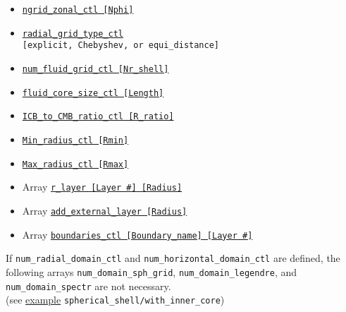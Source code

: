 \begin{itemize}
\begin{itemize}
			\item \hyperref[href_t:ngrid_zonal_ctl]{\tt ngrid\_zonal\_ctl [Nphi]}
%
			\item \hyperref[href_t:radial_grid_type_ctl]{\tt radial\_grid\_type\_ctl} \\
				\verb|[explicit, Chebyshev, or equi_distance]| \label{href_i:radial_grid_type_ctl}
%
			\item \hyperref[href_t:num_fluid_grid_ctl]{\tt num\_fluid\_grid\_ctl  [Nr\_shell]}
			\item \hyperref[href_t:fluid_core_size_ctl]{\tt fluid\_core\_size\_ctl  [Length]}
			\item \hyperref[href_t:ICB_to_CMB_ratio_ctl]{\tt ICB\_to\_CMB\_ratio\_ctl  [R\_ratio]}
			\item \hyperref[href_t:Min_radius_ctl]{\tt Min\_radius\_ctl  [Rmin]}    
				\label{href_i:Min_radius_ctl}
			\item \hyperref[href_t:Max_radius_ctl]{\tt Max\_radius\_ctl  [Rmax]}    
				\label{href_i:Max_radius_ctl}
%
\\
			\item Array \hyperref[href_t:r_layer]{\tt r\_layer  [Layer \#]  [Radius]}    
            \item Array \hyperref[href_t:add_external_layer]{\tt add\_external\_layer  [Radius]}
%
			\item Array \hyperref[href_t:boundaries_ctl]{\tt boundaries\_ctl  [Boundary\_name]  [Layer \#]}    
			\end{itemize}
		\end{itemize}

If \verb|num_radial_domain_ctl| and \verb|num_horizontal_domain_ctl| are defined, the following arrays \verb|num_domain_sph_grid|, \verb|num_domain_legendre|, and \verb|num_domain_spectr| are not necessary. \\
(see \hyperref[href_t:gen_w_innercore]{example} \verb|spherical_shell/with_inner_core|)

